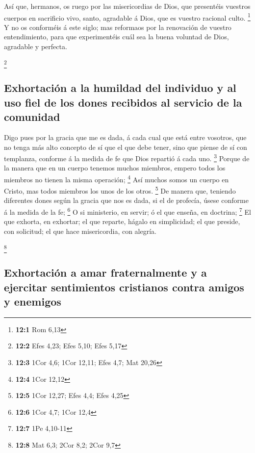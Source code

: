  Así que, hermanos, os ruego por las misericordias de
Dios, que presentéis vuestros cuerpos en sacrificio vivo, santo,
agradable á Dios, que es vuestro racional culto. \footnote{\textbf{12:1}
  Rom 6,13}  Y no os conforméis á este siglo; mas
reformaos por la renovación de vuestro entendimiento, para que
experimentéis cuál sea la buena voluntad de Dios, agradable y perfecta.

\footnote{\textbf{12:2} Efes 4,23; Efes 5,10; Efes 5,17}

\hypertarget{exhortaciuxf3n-a-la-humildad-del-individuo-y-al-uso-fiel-de-los-dones-recibidos-al-servicio-de-la-comunidad}{%
\subsection{Exhortación a la humildad del individuo y al uso fiel de los
dones recibidos al servicio de la
comunidad}\label{exhortaciuxf3n-a-la-humildad-del-individuo-y-al-uso-fiel-de-los-dones-recibidos-al-servicio-de-la-comunidad}}

 Digo pues por la gracia que me es dada, á cada cual que
está entre vosotros, que no tenga más alto concepto de sí que el que
debe tener, sino que piense de sí con templanza, conforme á la medida de
fe que Dios repartió á cada uno. \footnote{\textbf{12:3} 1Cor 4,6; 1Cor
  12,11; Efes 4,7; Mat 20,26}  Porque de la manera que en
un cuerpo tenemos muchos miembros, empero todos los miembros no tienen
la misma operación; \footnote{\textbf{12:4} 1Cor 12,12} 
Así muchos somos un cuerpo en Cristo, mas todos miembros los unos de los
otros. \footnote{\textbf{12:5} 1Cor 12,27; Efes 4,4; Efes 4,25}
 De manera que, teniendo diferentes dones según la gracia
que nos es dada, si el de profecía, úsese conforme á la medida de la fe;
\footnote{\textbf{12:6} 1Cor 4,7; 1Cor 12,4}  O si
ministerio, en servir; ó el que enseña, en doctrina; \footnote{\textbf{12:7}
  1Pe 4,10-11}  El que exhorta, en exhortar; el que
reparte, hágalo en simplicidad; el que preside, con solicitud; el que
hace misericordia, con alegría.

\footnote{\textbf{12:8} Mat 6,3; 2Cor 8,2; 2Cor 9,7}

\hypertarget{exhortaciuxf3n-a-amar-fraternalmente-y-a-ejercitar-sentimientos-cristianos-contra-amigos-y-enemigos}{%
\subsection{Exhortación a amar fraternalmente y a ejercitar sentimientos
cristianos contra amigos y
enemigos}\label{exhortaciuxf3n-a-amar-fraternalmente-y-a-ejercitar-sentimientos-cristianos-contra-amigos-y-enemigos}}

